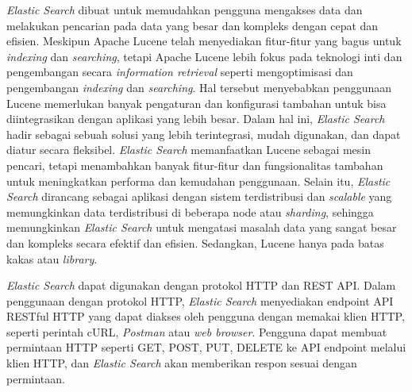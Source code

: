 \textit{Elastic Search} dibuat untuk memudahkan pengguna mengakses data dan melakukan pencarian pada data yang besar dan kompleks dengan cepat dan efisien. Meskipun Apache Lucene telah menyediakan fitur-fitur yang bagus untuk \textit{indexing} dan \textit{searching}, tetapi Apache Lucene lebih fokus pada teknologi inti dan pengembangan secara \textit{information retrieval} seperti mengoptimisasi dan pengembangan \textit{indexing} dan \textit{searching}. Hal tersebut menyebabkan penggunaan Lucene memerlukan banyak pengaturan dan konfigurasi tambahan untuk bisa diintegrasikan dengan aplikasi yang lebih besar. Dalam hal ini, \textit{Elastic Search} hadir sebagai sebuah solusi yang lebih terintegrasi, mudah digunakan, dan dapat diatur secara fleksibel. \textit{Elastic Search} memanfaatkan Lucene sebagai mesin pencari, tetapi menambahkan banyak fitur-fitur dan fungsionalitas tambahan untuk meningkatkan performa dan kemudahan penggunaan. Selain itu, \textit{Elastic Search} dirancang sebagai aplikasi dengan sistem terdistribusi dan \textit{scalable} yang memungkinkan data terdistribusi di beberapa node atau \textit{sharding}, sehingga memungkinkan \textit{Elastic Search} untuk mengatasi masalah data yang sangat besar dan kompleks secara efektif dan efisien. Sedangkan, Lucene hanya pada batas kakas atau \textit{library}.

\textit{Elastic Search} dapat digunakan dengan protokol HTTP dan REST API. Dalam penggunaan dengan protokol HTTP, \textit{Elastic Search} menyediakan endpoint API RESTful HTTP yang dapat diakses oleh pengguna dengan memakai klien HTTP, seperti perintah cURL, \textit{Postman} atau \textit{web browser}. Pengguna dapat membuat permintaan HTTP seperti GET, POST, PUT, DELETE ke API endpoint melalui klien HTTP, dan \textit{Elastic Search} akan memberikan respon sesuai dengan permintaan.

